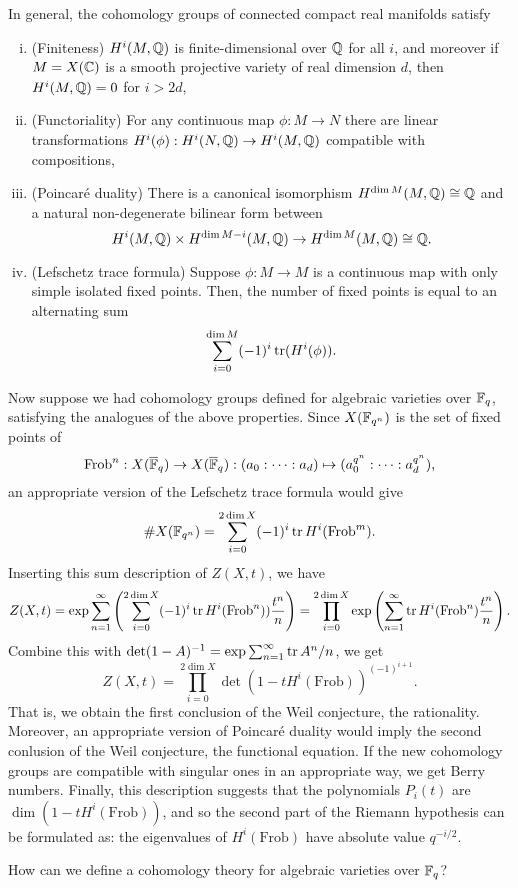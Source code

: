 \documentclass{../../../small}
\begin{document}
In general, the cohomology groups of connected compact real manifolds satisfy
\begin{enumerate}[(i)]
\item (Finiteness) $H^i(M,\mathbb{Q})$ is finite-dimensional over $\mathbb{Q}$ for all $i$, and moreover if $M=X(\mathbb{C})$ is a smooth projective variety of real dimension $d$, then $H^i(M,\mathbb{Q})=0$ for $i>2d$,
\item (Functoriality) For any continuous map $\phi:M\to N$ there are linear transformations $H^i(\phi):H^i(N,\mathbb{Q})\to H^i(M,\mathbb{Q})$ compatible with compositions,
\item (Poincar\'e duality) There is a canonical isomorphism $H^{\dim M}(M,\mathbb{Q})\cong\mathbb{Q}$ and a natural non-degenerate bilinear form between
\[H^i(M,\mathbb{Q})\times H^{\dim M-i}(M,\mathbb{Q})\to H^{\dim M}(M,\mathbb{Q})\cong\mathbb{Q}.\]
\item (Lefschetz trace formula) Suppose $\phi:M\to M$ is a continuous map with only simple isolated fixed points.
Then, the number of fixed points is equal to an alternating sum
\[\sum_{i=0}^{\dim M}(-1)^i\operatorname{tr}(H^i(\phi)).\]
\end{enumerate}

Now suppose we had cohomology groups defined for algebraic varieties over $\mathbb{F}_q$, satisfying the analogues of the above properties.
Since $X(\mathbb{F}_{q^n})$ is the set of fixed points of
\[\mathrm{Frob}^n:X(\overline{\mathbb{F}}_q)\to X(\overline{\mathbb{F}}_q):(a_0:\cdots:a_d)\mapsto(a_0^{q^n}:\cdots:a_d^{q^n}),\]
an appropriate version of the Lefschetz trace formula would give
\[\#X(\mathbb{F}_{q^n})=\sum_{i=0}^{2\dim X}(-1)^i\operatorname{tr} H^i(\mathrm{Frob}^m).\]
Inserting this sum description of $Z(X,t)$, we have
\[Z(X,t)=\exp\sum_{n=1}^\infty\left(\sum_{i=0}^{2\dim X}(-1)^i\operatorname{tr} H^i(\mathrm{Frob}^n))\frac{t^n}n\right)=\prod_{i=0}^{2\dim X}\exp\left(\sum_{n=1}^\infty\operatorname{tr} H^i(\mathrm{Frob}^n)\frac{t^n}n\right).\]
Combine this with $\det(1-A)^{-1}=\exp\sum_{n=1}^\infty\operatorname{tr} A^n/n$, we get
\[Z(X,t)=\prod_{i=0}^{2\dim X}\det(1-tH^i(\mathrm{Frob}))^{(-1)^{i+1}}.\]
That is, we obtain the first conclusion of the Weil conjecture, the rationality.
Moreover, an appropriate version of Poincar\'e duality would imply the second conlusion of the Weil conjecture, the functional equation.
If the new cohomology groups are compatible with singular ones in an appropriate way, we get Berry numbers.
Finally, this description suggests that the polynomials $P_i(t)$ are $\dim(1-tH^i(\mathrm{Frob}))$, and so the second part of the Riemann hypothesis can be formulated as: the eigenvalues of $H^i(\mathrm{Frob})$ have absolute value $q^{-i/2}$.

How can we define a cohomology theory for algebraic varieties over $\mathbb{F}_q$?
\end{document}

